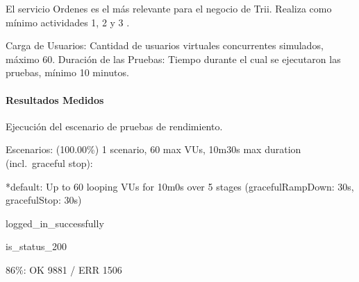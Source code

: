 \documentclass[
  paper=a4,
  ,captions=tableheading
]{scrartcl}
\renewenvironment{quote}{\begin{customblockquote}\list{}{\rightmargin=0em\leftmargin=0em}%
\item\relax\color{blockquote-text}\ignorespaces}{\unskip\unskip\endlist\end{customblockquote}}
\begin{document}
El servicio Ordenes es el más relevante para el negocio de Trii. Realiza
como mínimo actividades 1, 2 y 3 .

Carga de Usuarios: Cantidad de usuarios virtuales concurrentes
simulados, máximo 60. Duración de las Pruebas: Tiempo durante el cual se
ejecutaron las pruebas, mínimo 10 minutos.

\paragraph{Resultados Medidos}\label{sec:resultados-medidos-2}

Ejecución del escenario de pruebas de rendimiento.

\begin{quote}
Escenarios: (100.00\%) 1 scenario, 60 max VUs, 10m30s max duration
(incl.~graceful stop):

*default: Up to 60 looping VUs for 10m0s over 5 stages
(gracefulRampDown: 30s, gracefulStop: 30s)

logged\_in\_successfully

is\_status\_200

86\%: OK 9881 / ERR 1506
\end{quote}
\end{document}
